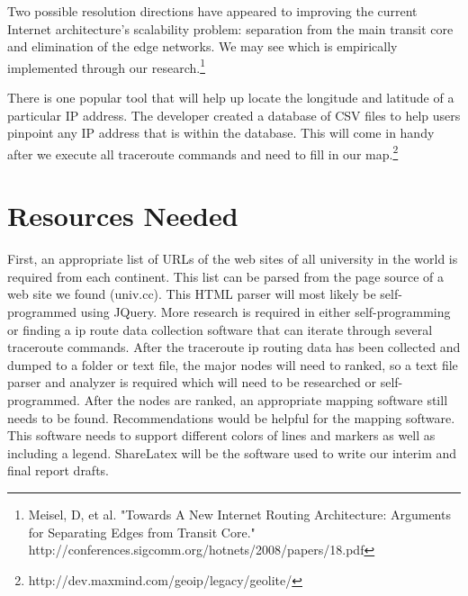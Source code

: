 \documentclass{sigcomm-alternate}
\begin{document}
Two possible resolution directions have appeared to improving the current Internet architecture's scalability problem:  separation from the main transit core and elimination of the edge networks. We may see which is empirically implemented through our research.\footnote{Meisel, D, et al. "Towards A New Internet Routing Architecture: Arguments for Separating Edges from Transit Core." http://conferences.sigcomm.org/hotnets/2008/papers/18.pdf }

There is one popular tool that will help up locate the longitude and latitude of a particular IP address. The developer created a database of CSV files to help users pinpoint any IP address that is within the database. This will come in handy after we execute all traceroute commands and need to fill in our map.\footnote{http://dev.maxmind.com/geoip/legacy/geolite/}
\section{Resources Needed}

First, an appropriate list of URLs of the web sites of all university in the world is required from each continent. This list can be parsed from the page source of a web site we found (univ.cc). This HTML parser will most likely be self-programmed using JQuery. More research is required in either self-programming or finding a ip route data collection software that can iterate through several traceroute commands. After the traceroute ip routing data has been collected and dumped to a folder  or text file, the major nodes will need to ranked, so a text file parser and analyzer is required which will need to be researched or self-programmed. After the nodes are ranked, an appropriate mapping software still needs to be found. Recommendations would be helpful for the mapping software. This software needs to support different colors of lines and markers as well as including a legend. ShareLatex will be the software used to write our interim and final report drafts.

\end{document}
